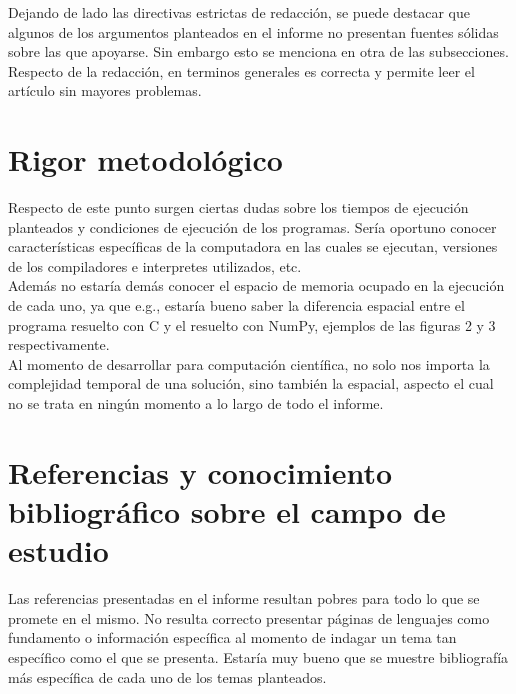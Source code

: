 \documentclass[osajnl,twocolumn,showpacs,superscriptaddress,11pt]{revtex4-1} %
\begin{document}
Dejando de lado las directivas estrictas de redacción, se puede destacar que algunos de los argumentos planteados en el informe no presentan fuentes sólidas sobre las que apoyarse. Sin embargo esto se menciona en otra de las subsecciones. Respecto de la redacción, en terminos generales es correcta y permite leer el artículo sin mayores problemas. \\

\section{Rigor metodológico}

Respecto de este punto surgen ciertas dudas sobre los tiempos de ejecución planteados y condiciones de ejecución de los programas. Sería oportuno conocer características específicas de la computadora en las cuales se ejecutan, versiones de los compiladores e interpretes utilizados, etc. \\

Además no estaría demás conocer el espacio de memoria ocupado en la ejecución de cada uno, ya que e.g., estaría bueno saber la diferencia espacial entre el programa resuelto con C y el resuelto con NumPy, ejemplos de las figuras 2 y 3 respectivamente. \\

Al momento de desarrollar para computación científica, no solo nos importa la complejidad temporal de una solución, sino también la espacial, aspecto el cual no se trata en ningún momento a lo largo de todo el informe. \\

\section{Referencias y conocimiento bibliográfico sobre el campo de estudio}

Las referencias presentadas en el informe resultan pobres para todo lo que se promete en el mismo. No resulta correcto presentar páginas de lenguajes como fundamento o información específica al momento de indagar un tema tan específico como el que se presenta. Estaría muy bueno que se muestre bibliografía más específica de cada uno de los temas planteados. \\
\end{document}

